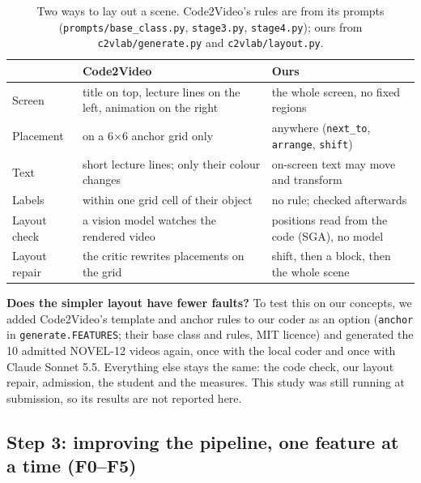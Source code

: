 \documentclass[11pt]{article}
\begin{document}
\begin{table}[!htbp]\centering\footnotesize
\caption{Two ways to lay out a scene. Code2Video's rules are from its prompts (\texttt{prompts/base\_class.py},
\texttt{stage3.py}, \texttt{stage4.py}); ours from \texttt{c2vlab/generate.py} and \texttt{c2vlab/layout.py}.}
\label{tab:layout_designs}
\begin{tabular}{@{}p{}p{}p{}@{}}\toprule
 & Code2Video & Ours \\\midrule
Screen & title on top, lecture lines on the left, animation on the right & the whole screen, no fixed regions \\
Placement & on a 6$\times$6 anchor grid only & anywhere (\texttt{next\_to}, \texttt{arrange}, \texttt{shift}) \\
Text & short lecture lines; only their colour changes & on-screen text may move and transform \\
Labels & within one grid cell of their object & no rule; checked afterwards \\
Layout check & a vision model watches the rendered video & positions read from the code (SGA), no model \\
Layout repair & the critic rewrites placements on the grid & shift, then a block, then the whole scene \\\bottomrule
\end{tabular}
\end{table}

\textbf{Does the simpler layout have fewer faults?} To test this on our concepts, we added Code2Video's template and
anchor rules to our coder as an option (\texttt{anchor} in \texttt{generate.FEATURES}; their base class and rules,
MIT licence) and generated the 10 admitted NOVEL-12 videos again, once with the local coder and once with Claude Sonnet
5.5. Everything else stays the same: the code check, our layout repair, admission, the student and the measures. This
study was still running at submission, so its results are not reported here.

\subsection{Step 3: improving the pipeline, one feature at a time (F0--F5)}

\end{document}
